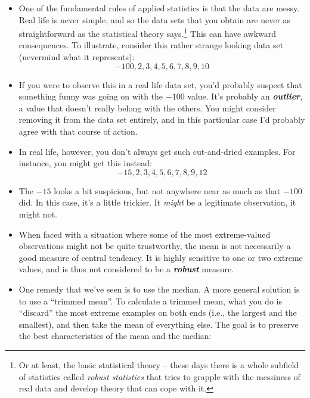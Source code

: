 \documentclass[
]{book}
\begin{document}
\begin{itemize}
\item
  One of the fundamental rules of applied statistics is that the data are messy. Real life is never simple, and so the data sets that you obtain are never as straightforward as the statistical theory says.\footnote{Or at least, the basic statistical theory -- these days there is a whole subfield of statistics called \emph{robust statistics} that tries to grapple with the messiness of real data and develop theory that can cope with it.} This can have awkward consequences. To illustrate, consider this rather strange looking data set (nevermind what it represents):
  \[
  -100,2,3,4,5,6,7,8,9,10
  \]
\item
  If you were to observe this in a real life data set, you'd probably suspect that something funny was going on with the \(-100\) value. It's probably an \textbf{\emph{outlier}}, a value that doesn't really belong with the others. You might consider removing it from the data set entirely, and in this particular case I'd probably agree with that course of action.
\item
  In real life, however, you don't always get such cut-and-dried examples. For instance, you might get this instead:
  \[
  -15,2,3,4,5,6,7,8,9,12
  \]
\item
  The \(-15\) looks a bit suspicious, but not anywhere near as much as that \(-100\) did. In this case, it's a little trickier. It \emph{might} be a legitimate observation, it might not.
\item
  When faced with a situation where some of the most extreme-valued observations might not be quite trustworthy, the mean is not necessarily a good measure of central tendency. It is highly sensitive to one or two extreme values, and is thus not considered to be a \textbf{\emph{robust}} measure.
\item
  One remedy that we've seen is to use the median. A more general solution is to use a ``trimmed mean''. To calculate a trimmed mean, what you do is ``discard'' the most extreme examples on both ends (i.e., the largest and the smallest), and then take the mean of everything else. The goal is to preserve the best characteristics of the mean and the median:


\end{itemize}
\end{document}
